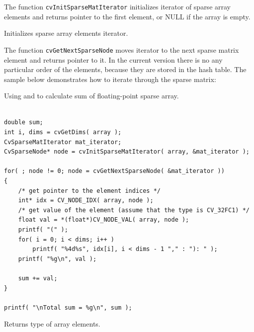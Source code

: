 The function \texttt{cvInitSparseMatIterator} initializes iterator of
sparse array elements and returns pointer to the first element, or NULL
if the array is empty.

\label{GetNextSparseNode}

Initializes sparse array elements iterator.


\begin{description}
\end{description}


The function \texttt{cvGetNextSparseNode} moves iterator to the next sparse matrix element and returns pointer to it. In the current version there is no any particular order of the elements, because they are stored in the hash table. The sample below demonstrates how to iterate through the sparse matrix:

Using  and  to calculate sum of floating-point sparse array.

\begin{lstlisting}

double sum;
int i, dims = cvGetDims( array );
CvSparseMatIterator mat_iterator;
CvSparseNode* node = cvInitSparseMatIterator( array, &mat_iterator );

for( ; node != 0; node = cvGetNextSparseNode( &mat_iterator ))
{
    /* get pointer to the element indices */
    int* idx = CV_NODE_IDX( array, node );
    /* get value of the element (assume that the type is CV_32FC1) */
    float val = *(float*)CV_NODE_VAL( array, node );
    printf( "(" );
    for( i = 0; i < dims; i++ )
        printf( "%4d%s", idx[i], i < dims - 1 "," : "): " );
    printf( "%g\n", val );

    sum += val;
}

printf( "\nTotal sum = %g\n", sum );

\end{lstlisting}

\fi

\label{GetElemType}

Returns type of array elements.


